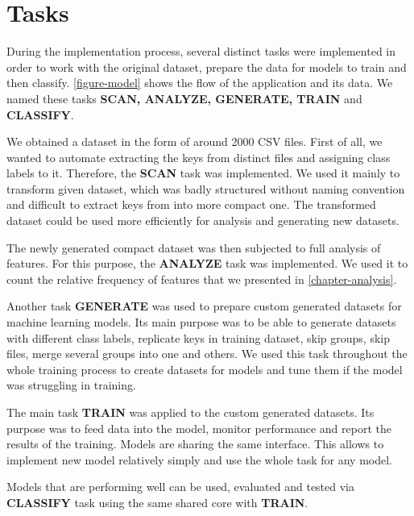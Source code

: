 \section{Tasks}

During the implementation process, several distinct tasks were implemented in order to work with the original dataset, prepare the data for models to train and then classify. \autoref{figure-model} shows the flow of the application and its data. We named these tasks \textbf{SCAN, ANALYZE, GENERATE, TRAIN} and \textbf{CLASSIFY}.

We obtained a dataset in the form of around 2000 CSV files. First of all, we wanted to automate extracting the keys from distinct files and assigning class labels to it. Therefore, the \textbf{SCAN} task was implemented. We used it mainly to transform given dataset, which was badly structured without naming convention and difficult to extract keys from into more compact one. The transformed dataset could be used more efficiently for analysis and generating new datasets.

The newly generated compact dataset was then subjected to full analysis of features. For this purpose, the \textbf{ANALYZE} task was implemented. We used it to count the relative frequency of features that we presented in \autoref{chapter-analysis}.

Another task \textbf{GENERATE} was used to prepare custom generated datasets for machine learning models. Its main purpose was to be able to generate datasets with different class labels, replicate keys in training dataset, skip groups, skip files, merge several groups into one and others. We used this task throughout the whole training process to create datasets for models and tune them if the model was struggling in training.

The main task \textbf{TRAIN} was applied to the custom generated datasets. Its purpose was to feed data into the model, monitor performance and report the results of the training. Models are sharing the same interface. This allows to implement new model relatively simply and use the whole task for any model.

Models that are performing well can be used, evaluated and tested via \textbf{CLASSIFY} task using the same shared core with \textbf{TRAIN}.

